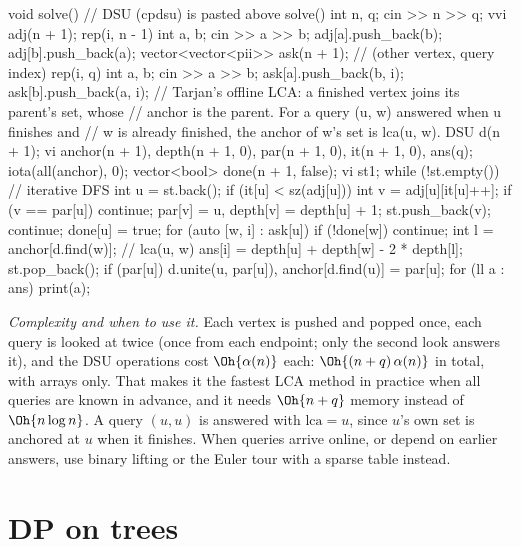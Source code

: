 \begin{code}
void solve() {  // DSU (cpdsu) is pasted above solve()
    int n, q;
    cin >> n >> q;
    vvi adj(n + 1);
    rep(i, n - 1) {
        int a, b;
        cin >> a >> b;
        adj[a].push_back(b);
        adj[b].push_back(a);
    }
    vector<vector<pii>> ask(n + 1);  // (other vertex, query index)
    rep(i, q) {
        int a, b;
        cin >> a >> b;
        ask[a].push_back({b, i});
        ask[b].push_back({a, i});
    }
    // Tarjan's offline LCA: a finished vertex joins its parent's set, whose
    // anchor is the parent. For a query (u, w) answered when u finishes and
    // w is already finished, the anchor of w's set is lca(u, w).
    DSU d(n + 1);
    vi anchor(n + 1), depth(n + 1, 0), par(n + 1, 0), it(n + 1, 0), ans(q);
    iota(all(anchor), 0);
    vector<bool> done(n + 1, false);
    vi st{1};
    while (!st.empty()) {  // iterative DFS
        int u = st.back();
        if (it[u] < sz(adj[u])) {
            int v = adj[u][it[u]++];
            if (v == par[u]) continue;
            par[v] = u, depth[v] = depth[u] + 1;
            st.push_back(v);
            continue;
        }
        done[u] = true;
        for (auto [w, i] : ask[u]) {
            if (!done[w]) continue;
            int l = anchor[d.find(w)];  // lca(u, w)
            ans[i] = depth[u] + depth[w] - 2 * depth[l];
        }
        st.pop_back();
        if (par[u]) d.unite(u, par[u]), anchor[d.find(u)] = par[u];
    }
    for (ll a : ans) print(a);
}
\end{code}


\emph{Complexity and when to use it.} Each vertex is pushed and popped once, each query is looked at twice (once from each
endpoint; only the second look answers it), and the DSU operations cost $\Oh{\alpha(n)}$ each: $\Oh{(n + q)\,\alpha(n)}$ in
total, with arrays only. That makes it the fastest LCA method in practice when all queries are known in advance, and it needs
$\Oh{n + q}$ memory instead of $\Oh{n \log n}$. A query $(u, u)$ is answered with $\mathrm{lca} = u$, since $u$'s own set is
anchored at $u$ when it finishes. When queries arrive online, or depend on earlier answers, use binary lifting or the Euler tour
with a sparse table instead.

\section[DP on trees]{DP on trees \hfill \gold}\label{sec:treedp}

